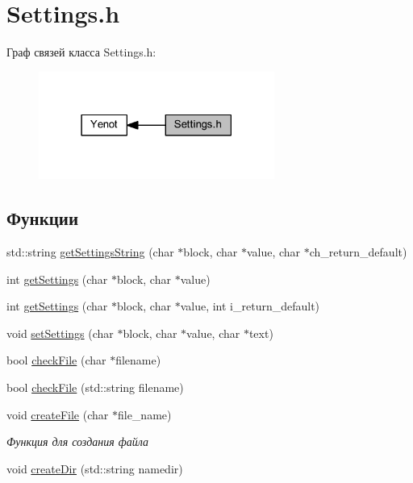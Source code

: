 \hypertarget{group__settingsh}{}\section{Settings.\+h}
\label{group__settingsh}
Граф связей класса Settings.\+h\+:
\nopagebreak
\begin{figure}[H]
\begin{center}
\leavevmode
\includegraphics[width=219pt]{group__settingsh}
\end{center}
\end{figure}
\subsection*{Функции}
\begin{DoxyCompactItemize}
\item 
std\+::string \mbox{\hyperlink{group__settingsh_ga3a0f1e87eb01bdd16c4a7e365aa283eb}{get\+Settings\+String}} (char $\ast$block, char $\ast$value, char $\ast$ch\+\_\+return\+\_\+default)
\item 
int \mbox{\hyperlink{group__settingsh_ga68b4d9ed6be7aaa93d9a6fe8fd683862}{get\+Settings}} (char $\ast$block, char $\ast$value)
\item 
int \mbox{\hyperlink{group__settingsh_ga0a2fe94de4037eda33c49fe332970891}{get\+Settings}} (char $\ast$block, char $\ast$value, int i\+\_\+return\+\_\+default)
\item 
void \mbox{\hyperlink{group__settingsh_ga463e32ccb37f9478b0e62ee0d21c5999}{set\+Settings}} (char $\ast$block, char $\ast$value, char $\ast$text)
\item 
bool \mbox{\hyperlink{group__settingsh_ga2dd1bc039652a0480c444957d416b6a6}{check\+File}} (char $\ast$filename)
\item 
bool \mbox{\hyperlink{group__settingsh_ga147bed619c6314e960320c1bcb40ed91}{check\+File}} (std\+::string filename)
\item 
void \mbox{\hyperlink{group__settingsh_ga8f34a2030acfb5567678ab2bba25f3c1}{create\+File}} (char $\ast$file\+\_\+name)
\begin{DoxyCompactList}\small\item\em Функция для создания файла \end{DoxyCompactList}\item 
void \mbox{\hyperlink{group__settingsh_ga912b67f6f6b05abadd055a379dd84864}{create\+Dir}} (std\+::string namedir)
\end{DoxyCompactItemize}


